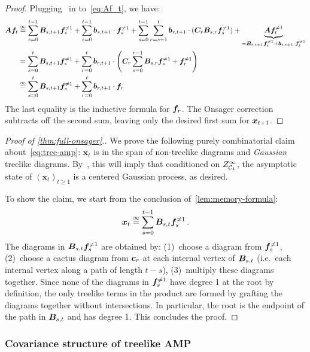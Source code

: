 \begin{proof}
    Plugging~ in to~\cref{eq:Af_t}, we have:
    \begin{align*}
        {\bm A} {\bm f}_t &\overset{\infty}{=} \sum_{s = 0}^{t-1} {\bm B}_{s,t+1} {\bm f}_s^{\neq 1} + \sum_{s=0}^{t-1}{\bm b}_{s,t+1} \cdot {\bm f}_s^{\neq 1} + \sum_{s=0}^{t-1}\sum_{r=s+1}^t {\bm b}_{r,t+1}\cdot ({\bm C}_r {\bm B}_{s,r} {\bm f}^{\neq 1}_s)+ \underbrace{{\bm A} {\bm f}_t^{\neq 1}}_{= {\bm B}_{t,t+1} {\bm f}_t^{\neq 1} + {\bm b}_{t,t+1} \cdot {\bm f}_t^{\neq 1}}\\
        &= \sum_{s = 0}^{t} {\bm B}_{s,t+1} {\bm f}^{\neq 1}_s + \sum_{r = 0}^t {\bm b}_{r,t+1} \cdot \left({\bm C}_r \sum_{s = 0}^{r-1} {\bm B}_{s,r}{\bm f}_s^{\neq 1} + {\bm f}_r^{\neq 1} \right)\\
        &\overset{\infty}{=} \sum_{s = 0}^{t} {\bm B}_{s,t+1} {\bm f}^{\neq 1}_s + \sum_{r = 0}^t {\bm b}_{r,t+1} \cdot {\bm f}_r
    \end{align*}
    \endgroup
    The last equality is the inductive formula for ${\bm f}_r$.
    The Onsager correction subtracts off the second sum, leaving only the desired first sum for ${\bm x}_{t+1}$.
\end{proof}


\begin{proof}[Proof of \cref{thm:full-onsager}.]
    We prove the following purely combinatorial claim about~\cref{eq:tree-amp}:
    $\bm x_t$ is in
    the span of non-treelike
    diagrams and {\em Gaussian} treelike
    diagrams.  
    By~, this will
    imply
    that conditioned on $Z^\infty_{{\cal C}_1}$, the asymptotic state of $(\bm x_t)_{t\ge 1}$ is a centered Gaussian process, as desired.

    To show the claim, 
    we start from the conclusion of~\cref{lem:memory-formula}:
    \[
        {\bm x}_t \overset{\infty}{=} \sum_{s=0}^{t-1}{\bm B}_{s,t}{\bm f}_s^{\neq 1}\,.
    \]
    The diagrams in ${\bm B}_{s,t}{\bm f}_{s}^{\neq 1}$ are obtained by: (1)~choose a diagram from ${\bm f}_{s}^{\neq 1}$, (2)~choose a cactus diagram from ${\bm c}_r$ at each internal vertex of ${\bm B}_{s,t}$
    (i.e.\ each internal vertex along a path of length $t-s$),
    (3)~multiply these diagrams together.
    Since none of the diagrams in ${\bm f}_s^{\neq 1}$ have degree 1 at the root by definition,
    the only treelike terms in the product are formed by grafting the diagrams together without intersections.
    In particular, the root is the endpoint of the path in ${\bm B}_{s,t}$ and has degree 1.
    This concludes the proof.
\end{proof}

\subsubsection{Covariance structure of treelike AMP}

